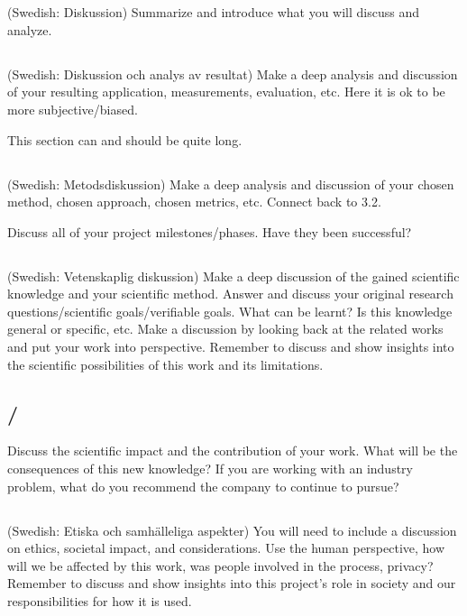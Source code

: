 \section{}\label{sec:discussion}
(Swedish: Diskussion) Summarize and introduce what you will discuss and analyze.

\subsection{}
(Swedish: Diskussion och analys av resultat) Make a deep analysis and discussion of your resulting application, measurements, evaluation, etc. Here it is ok to be more subjective/biased.

This section can and should be quite long.

\subsection{}
(Swedish: Metodsdiskussion) Make a deep analysis and discussion of your chosen method, chosen approach, chosen metrics, etc. Connect back to 3.2.

Discuss all of your project milestones/phases. Have they been successful?

\subsection{}
(Swedish: Vetenskaplig diskussion) Make a deep discussion of the gained scientific knowledge and your scientific method. Answer and discuss your original research questions/scientific goals/verifiable goals. What can be learnt? Is this knowledge general or specific, etc. Make a discussion by looking back at the related works and put your work into perspective. Remember to discuss and show insights into the scientific possibilities of this work and its limitations.

\subsection{/}
Discuss the scientific impact and the contribution of your work. What will be the consequences of this new knowledge? If you are working with an industry problem, what do you recommend the company to continue to pursue?

\subsection{}
(Swedish: Etiska och samhälleliga aspekter) You will need to include a discussion on ethics, societal impact, and considerations. Use the human perspective, how will we be affected by this work, was people involved in the process, privacy? Remember to discuss and show insights into this project’s role in society and our responsibilities for how it is used.
